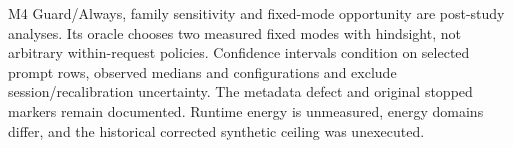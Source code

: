 M4 Guard/Always, family sensitivity and fixed-mode opportunity are post-study analyses. Its oracle chooses two measured fixed modes with hindsight, not arbitrary within-request policies. Confidence intervals condition on selected prompt rows, observed medians and configurations and exclude session/recalibration uncertainty. The metadata defect and original stopped markers remain documented. Runtime energy is unmeasured, energy domains differ, and the historical corrected synthetic ceiling was unexecuted.
